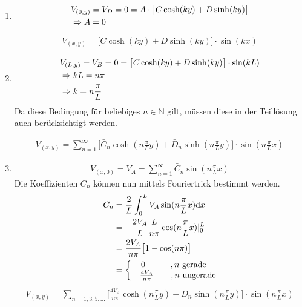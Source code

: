 \begin{enumerate}
	\item \begin{align}
		&V_{(0,y)} = V_D = 0 = A \cdot \bigl[C \cosh(ky) + D \sinh(ky)\bigr] \\
		&\Rightarrow A = 0  \notag 
	\end{align}
	\begin{align}
		V_{(x,y)} = \bigl[\bar{C} \cosh(ky) + \bar{D} \sinh(ky)\bigr] \cdot \sin(kx)
	\end{align}
	
	\item \begin{align}
		&V_{(L,y)} = V_B = 0 = \bigl[\bar{C} \cosh(ky) + \bar{D} \sinh(ky)\bigr] \cdot \sin(kL) \\
		&\Rightarrow kL = n \pi \notag \\   
		&\Rightarrow k = n \frac{\pi}{L}  \notag 
	\end{align}
	Da diese Bedingung für beliebiges $n \in \mathbb{N}$ gilt, müssen diese in der Teillösung auch berücksichtigt werden. 
	
	\begin{align}
		V_{(x,y)} = \sum_{n = 1}^{\infty} \bigl[\bar{C}_n \cosh(n \frac{\pi}{L} y) + \bar{D}_n \sinh(n \frac{\pi}{L} y) \bigr] \cdot \sin(n \frac{\pi}{L} x)
	\end{align}
	
	\item \begin{align}
		V_{(x,0)} = V_A = \sum_{n = 1}^{\infty} \bar{C}_n \sin(n \frac{\pi}{L} x)
	\end{align}
	Die Koeffizienten $\bar{C}_n$ können nun mittels \glqq Fouriertrick\grqq{} bestimmt werden. 
	\begin{align}
		\bar{C}_n &= \frac{2}{L} \int_{0}^{L} V_A \sin(n \frac{\pi}{L} x) \mathrm{d}x \\
		&= - \frac{2V_A}{L} \frac{L}{n \pi} \cos(n \frac{\pi}{L} x) |_0^L \notag \\
		&= \frac{2V_A}{n \pi} \bigl[ 1 - \cos(n \pi) \bigr] \notag \\
		&= \biggl\{ \begin{matrix}
			0 \qquad \quad, n~\mathrm{gerade} \\
			~~~\frac{4V_A}{n \pi} \qquad , n~\mathrm{ungerade}
		\end{matrix} \notag
	\end{align}
	\begin{align}
		V_{(x,y)} = \sum_{n = 1,3,5,...} \biggl[ \frac{4V_A}{n \pi} \cosh(n \frac{\pi}{L} y) + \bar{D}_n \sinh(n \frac{\pi}{L} y) \biggr] \cdot \sin(n \frac{\pi}{L} x)
	\end{align}
	

\end{enumerate}
